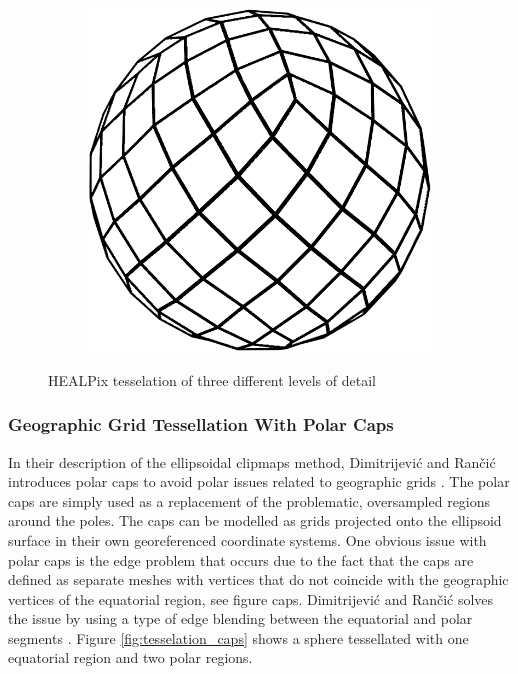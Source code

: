 \begin{figure}
\begin{subfigure}[b]{0.2\textwidth}
    \end{subfigure}
    ~ %
    \begin{subfigure}[b]{0.2\textwidth}
        \includegraphics[width=\textwidth]{figures/tessellation/tessellation_healpix3.png}
    \end{subfigure}
    \caption{HEALPix tesselation of three different levels of detail}
    \label{fig:tesselation_healpix}
\end{figure}

\subsubsection{Geographic Grid Tessellation With Polar Caps}

In their description of the ellipsoidal clipmaps method, Dimitrijevi\'{c} and Ran\v{c}i\'{c} introduces polar caps to avoid polar issues related to geographic grids \cite{dimi15}. The polar caps are simply used as a replacement of the problematic, oversampled regions around the poles. The caps can be modelled as grids projected onto the ellipsoid surface in their own georeferenced coordinate systems. One obvious issue with polar caps is the edge problem that occurs due to the fact that the caps are defined as separate meshes with vertices that do not coincide with the geographic vertices of the equatorial region, see figure caps. Dimitrijevi\'{c} and Ran\v{c}i\'{c} solves the issue by using a type of edge blending between the equatorial and polar segments \cite{dimi15}. Figure \ref{fig:tesselation_caps} shows a sphere tessellated with one equatorial region and two polar regions.

